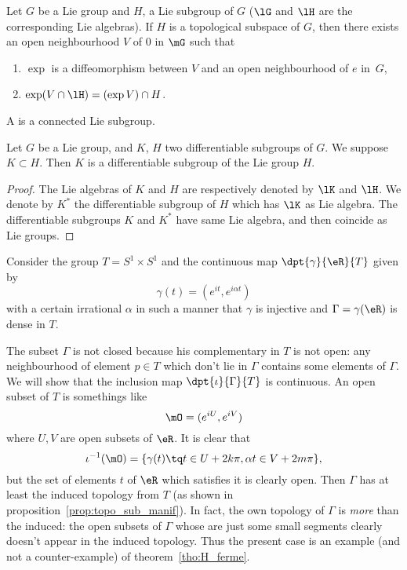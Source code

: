 \begin{lemma}       \label{LEMooOBIMooVvIDnb}
 Let $G$ be a Lie group and $H$, a Lie subgroup of $G$ ($\lG$ and $\lH$ are the corresponding Lie algebras). If $H$ is a topological subspace of $G$, then there exists an open neighbourhood $V$ of $0$ in $\mG$ such that
 \begin{enumerate}
 \item $\exp$ is a diffeomorphism between $V$ and an open neighbourhood of $e$ in~$G$,
 \item $\exp(V\cap\lH)=(\exp V)\cap H$.
 \end{enumerate}
\label{lem:sugroup_normal}
\end{lemma}

\begin{definition}
A  is a connected Lie subgroup.
\end{definition}

\begin{corollary}
Let $G$ be a Lie group, and $K$, $H$ two differentiable subgroups of $G$. We suppose $K\subset H$. Then $K$ is a differentiable subgroup of the Lie group $H$.
\end{corollary}

\begin{proof}
The Lie algebras of $K$ and $H$ are respectively denoted by $\lK$ and $\lH$. We denote by $K^*$ the differentiable subgroup of $H$ which has $\lK$ as Lie algebra. The differentiable subgroups $K$ and $K^*$ have same Lie algebra, and then coincide as Lie groups.
\end{proof}

\label{pg:ex_topo_Lie}
Consider the group $T=S^1\times S^1$ and the continuous map $\dpt{\gamma}{\eR}{T}$ given by
\[
  \gamma(t)=(e^{it},e^{i\alpha t})
\]
with a certain irrational $\alpha$ in such a manner that $\gamma$ is injective and $\Gamma=\gamma(\eR)$ is dense in $T$.

The subset $\Gamma$ is not closed because his complementary in $T$ is not open: any neighbourhood of element $p\in T$ which don't lie in $\Gamma$ contains some elements of $\Gamma$. We will show that the inclusion map $\dpt{\iota}{\Gamma}{T}$ is continuous. An open subset of $T$ is somethings like
\[
  \mO=(e^{iU},e^{iV})
\]
where $U,V$ are open subsets of $\eR$. It is clear that
\[
   \iota^{-1}(\mO)=\{ \gamma(t)\tq t\in U+2k\pi,\alpha t\in V+2m\pi \},
\]
but the set of elements $t$ of $\eR$ which satisfies it is clearly open. Then $\Gamma$ has at least the induced topology from $T$ (as shown in proposition~\ref{prop:topo_sub_manif}). In fact, the own topology of $\Gamma$ is \emph{more} than the induced: the open subsets of $\Gamma$ whose are just some small segments clearly doesn't appear in the induced topology. Thus the present case is an example (and not a counter-example) of theorem~\ref{tho:H_ferme}.

